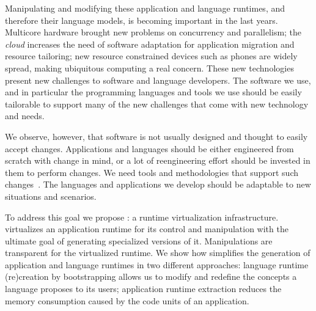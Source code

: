 Manipulating and modifying these application and language runtimes, and therefore their language models, is becoming important in the last years. Multicore hardware brought new problems on concurrency and parallelism; the \emph{cloud} increases the need of software adaptation for application migration and resource tailoring; new resource constrained devices such as phones are widely spread, making ubiquitous computing a real concern. These new technologies present new challenges to software and language developers. The software we use, and in particular the programming languages and tools we use should be easily tailorable to support many of the new challenges that come with new technology and needs.

We observe, however, that software is not usually designed and thought to easily accept changes. Applications and languages should be either engineered from scratch with change in mind, or a lot of reengineering effort should be invested in them to perform changes. We need tools and methodologies that support such changes~\cite{Nier08b}. The languages and applications we develop should be adaptable to new situations and scenarios.

To address this goal we propose \emph{\Vtt}: a runtime virtualization infrastructure. \Vtt virtualizes an application runtime for its control and manipulation with the ultimate goal of generating specialized versions of it. Manipulations are transparent for the virtualized runtime. We show how \Vtt simplifies the generation of application and language runtimes in two different approaches: language runtime (re)creation by bootstrapping allows us to modify and redefine the concepts a language proposes to its users; application runtime extraction reduces the memory consumption caused by the code units of an application.



